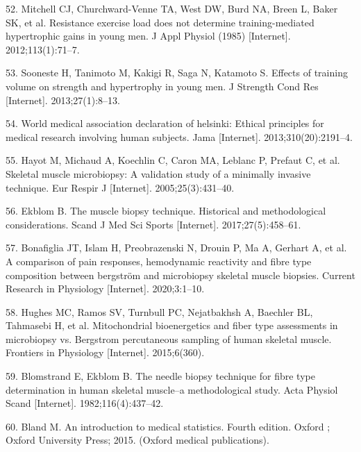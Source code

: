 \documentclass[twoside,10pt]{gihclass} %
\begin{document}
\leavevmode\hypertarget{ref-RN834}{}%
52. Mitchell CJ, Churchward-Venne TA, West DW, Burd NA, Breen L, Baker SK, et al. Resistance exercise load does not determine training-mediated hypertrophic gains in young men. J Appl Physiol (1985) {[}Internet{]}. 2012;113(1):71--7.

\leavevmode\hypertarget{ref-RN1607}{}%
53. Sooneste H, Tanimoto M, Kakigi R, Saga N, Katamoto S. Effects of training volume on strength and hypertrophy in young men. J Strength Cond Res {[}Internet{]}. 2013;27(1):8--13.

\leavevmode\hypertarget{ref-RN2548}{}%
54. World medical association declaration of helsinki: Ethical principles for medical research involving human subjects. Jama {[}Internet{]}. 2013;310(20):2191--4.

\leavevmode\hypertarget{ref-RN824}{}%
55. Hayot M, Michaud A, Koechlin C, Caron MA, Leblanc P, Prefaut C, et al. Skeletal muscle microbiopsy: A validation study of a minimally invasive technique. Eur Respir J {[}Internet{]}. 2005;25(3):431--40.

\leavevmode\hypertarget{ref-RN2549}{}%
56. Ekblom B. The muscle biopsy technique. Historical and methodological considerations. Scand J Med Sci Sports {[}Internet{]}. 2017;27(5):458--61.

\leavevmode\hypertarget{ref-RN2553}{}%
57. Bonafiglia JT, Islam H, Preobrazenski N, Drouin P, Ma A, Gerhart A, et al. A comparison of pain responses, hemodynamic reactivity and fibre type composition between bergström and microbiopsy skeletal muscle biopsies. Current Research in Physiology {[}Internet{]}. 2020;3:1--10.

\leavevmode\hypertarget{ref-RN2552}{}%
58. Hughes MC, Ramos SV, Turnbull PC, Nejatbakhsh A, Baechler BL, Tahmasebi H, et al. Mitochondrial bioenergetics and fiber type assessments in microbiopsy vs. Bergstrom percutaneous sampling of human skeletal muscle. Frontiers in Physiology {[}Internet{]}. 2015;6(360).

\leavevmode\hypertarget{ref-RN874}{}%
59. Blomstrand E, Ekblom B. The needle biopsy technique for fibre type determination in human skeletal muscle--a methodological study. Acta Physiol Scand {[}Internet{]}. 1982;116(4):437--42.

\leavevmode\hypertarget{ref-RN2007}{}%
60. Bland M. An introduction to medical statistics. Fourth edition. Oxford ; Oxford University Press; 2015. (Oxford medical publications).


\end{document}
